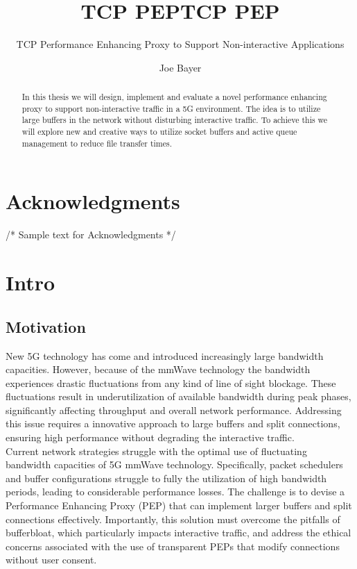 \documentclass[a4paper,english, 11pt]{report}
\author{Joe Bayer}
\title{TCP PEP}
\subtitle{TCP Performance Enhancing Proxy to Support Non-interactive Applications}
\title{TCP PEP}
\begin{document}
\uiomasterfp[program={Informatics: Programming and System Architecture}, supervisors={Michael Welzl\and Kristjon Ciko}]
\tableofcontents


\listoffigures
{}

\begin{abstract}
In this thesis we will design, implement and evaluate a novel performance enhancing proxy to support non-interactive traffic in a 5G environment. The idea is to utilize large buffers in the network without disturbing interactive traffic. To achieve this we will explore new and creative ways to utilize socket buffers and active queue management to reduce file transfer times.
\end{abstract}

\chapter*{Acknowledgments}
\lipsum[1-2]  /* Sample text for Acknowledgments */

\chapter{Intro}

\section{Motivation}
New 5G technology has come and introduced increasingly large bandwidth capacities\cite{Agrawal_Sharma_2016}. However, because of the mmWave technology the bandwidth experiences drastic fluctuations from any kind of line of sight blockage\cite{mmwave_blocking}. These fluctuations result in underutilization of available bandwidth during peak phases, significantly affecting throughput and overall network performance. Addressing this issue requires a innovative approach to large buffers and split connections, ensuring high performance without degrading the interactive traffic.\\

Current network strategies struggle with the optimal use of fluctuating bandwidth capacities of 5G mmWave technology\cite{Srivastava_Fund_Panwar_2020}. Specifically, packet schedulers and buffer configurations struggle to fully the utilization of high bandwidth periods, leading to considerable performance losses. The challenge is to devise a Performance Enhancing Proxy (PEP) that can implement larger buffers and split connections effectively. Importantly, this solution must overcome the pitfalls of bufferbloat\cite{hingane2020aqm}, which particularly impacts interactive traffic, and address the ethical concerns associated with the use of transparent PEPs that modify connections without user consent.
\end{document}
